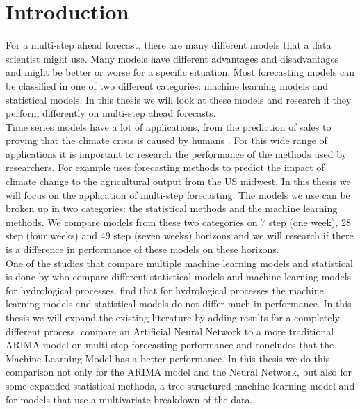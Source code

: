 \section{Introduction}
For a multi-step ahead forecast, there are many different models that a data scientist might use. Many models have different advantages and disadvantages and might be better or worse for a specific situation. Most forecasting models can be classified in one of two different categories: machine learning models and statistical models. In this thesis we will look at these models and research if they perform differently on multi-step ahead forecasts.\\

Time series models have a lot of applications, from the prediction of sales \citep{Pavlyshenko2019Machine-LearningForecasting} to proving that the climate crisis is caused by humans \citep{Stern2013AnthropogenicChange}. For this wide range of applications it is important to research the performance of the methods used by researchers. For example \cite{Crane-Droesch2018MachineAgriculture} uses forecasting methods to predict the impact of climate change to the agricultural output from the US midwest. In this thesis we will focus on the application of multi-step forecasting. The models we use can be broken up in two categories: the statistical methods and the machine learning methods. We compare models from these two categories on 7 step (one week), 28 step (four weeks) and 49 step (seven weeks) horizons and we will research if there is a difference in performance of these models on these horizons.\\

One of the studies that compare multiple machine learning models and statistical is done by \cite{Papacharalampous2019ComparisonProcesses} who compare different statistical models and machine learning models for hydrological processes. \cite{Papacharalampous2019ComparisonProcesses} find that for hydrological processes the machine learning models and statistical models do not differ much in performance. In this thesis we will expand the existing literature by adding results for a completely different process. \cite{Alon2001ForecastingMethods} compare an Artificial Neural Network to a more traditional ARIMA model on multi-step forecasting performance and concludes that the Machine Learning Model has a better performance. In this thesis we do this comparison not only for the ARIMA model and the Neural Network, but also for some expanded statistical methods, a tree structured machine learning model and for models that use a multivariate breakdown of the data.\\

